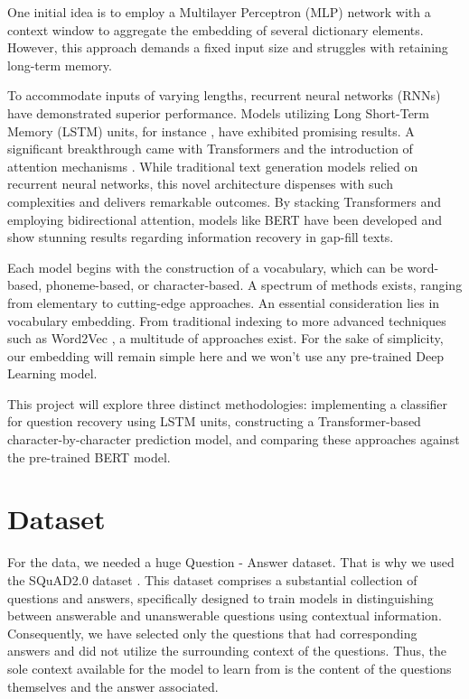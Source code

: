 \documentclass{article}
\begin{document}
One initial idea is to employ a Multilayer Perceptron (MLP) \cite{popescu2009multilayer} network with a context window to aggregate the embedding of several dictionary elements. However, this approach demands a fixed input size and struggles with retaining long-term memory.

To accommodate inputs of varying lengths, recurrent neural networks (RNNs) have demonstrated superior performance. Models utilizing Long Short-Term Memory (LSTM) units, for instance \cite{santhanam2020context}, have exhibited promising results. A significant breakthrough came with Transformers and the introduction of attention mechanisms \cite{vaswani2017attention}. While traditional text generation models relied on recurrent neural networks, this novel architecture dispenses with such complexities and delivers remarkable outcomes. By stacking Transformers and employing bidirectional attention, models like BERT \cite{devlin2019bert} have been developed and show stunning results regarding information recovery in gap-fill texts.

Each model begins with the construction of a vocabulary, which can be word-based, phoneme-based, or character-based. A spectrum of methods exists, ranging from elementary to cutting-edge approaches. An essential consideration lies in vocabulary embedding. From traditional indexing to more advanced techniques such as Word2Vec \cite{mikolov2013efficient}, a multitude of approaches exist. For the sake of simplicity, our embedding will remain simple here and we won't use any pre-trained Deep Learning model.

This project will explore three distinct methodologies: implementing a classifier for question recovery using LSTM units, constructing a Transformer-based character-by-character prediction model, and comparing these approaches against the pre-trained BERT model.

\section{Dataset}

For the data, we needed a huge Question - Answer dataset. That is why we used the SQuAD2.0 dataset \cite{squad}. This dataset comprises a substantial collection of questions and answers, specifically designed to train models in distinguishing between answerable and unanswerable questions using contextual information. Consequently, we have selected only the questions that had corresponding answers and did not utilize the surrounding context of the questions. Thus, the sole context available for the model to learn from is the content of the questions themselves and the answer associated.
\end{document}

